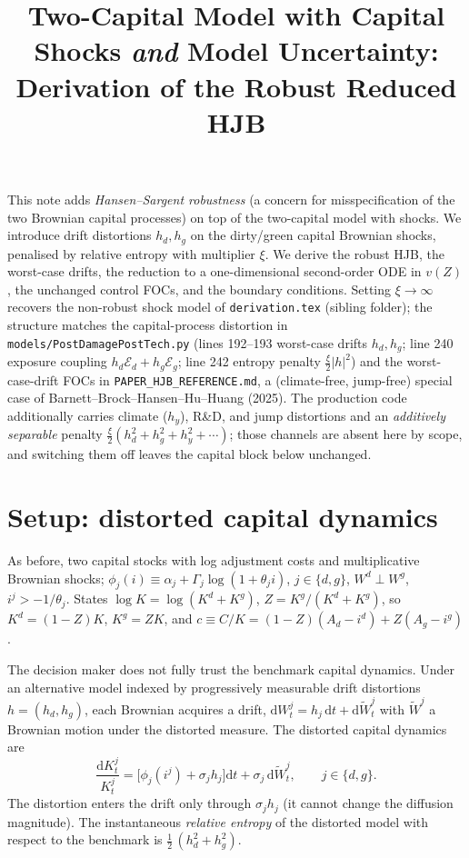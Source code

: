 \documentclass[11pt]{article}
\title{Two-Capital Model with Capital Shocks \emph{and} Model Uncertainty:\\
Derivation of the Robust Reduced HJB}
\author{}
\date{}
\newcommand{\dd}{\mathrm{d}}
\newcommand{\xicap}{\xi}
\begin{document}
\maketitle
\vspace{-3em}

This note adds \emph{Hansen--Sargent robustness} (a concern for misspecification of
the two Brownian capital processes) on top of the two-capital model with shocks. We
introduce drift distortions $h_d,h_g$ on the dirty/green capital Brownian shocks,
penalised by relative entropy with multiplier $\xicap$. We derive the robust HJB, the
worst-case drifts, the reduction to a one-dimensional second-order ODE in $v(Z)$, the
unchanged control FOCs, and the boundary conditions. Setting $\xicap\to\infty$ recovers
the non-robust shock model of \texttt{derivation.tex} (sibling folder); the structure
matches the capital-process distortion in \texttt{models/PostDamagePostTech.py}
(lines 192--193 worst-case drifts $h_d,h_g$; line 240 exposure coupling
$h_d\mathcal E_d+h_g\mathcal E_g$; line 242 entropy penalty $\tfrac{\xicap}{2}|h|^2$) and
the worst-case-drift FOCs in \texttt{PAPER\_HJB\_REFERENCE.md}, a (climate-free,
jump-free) special case of Barnett--Brock--Hansen--Hu--Huang (2025). The production code
additionally carries climate ($h_y$), R\&D, and jump distortions and an
\emph{additively separable} penalty $\tfrac{\xicap}{2}(h_d^2+h_g^2+h_y^2+\cdots)$; those
channels are absent here by scope, and switching them off leaves the capital block below
unchanged.

\section{Setup: distorted capital dynamics}

As before, two capital stocks with log adjustment costs and multiplicative Brownian
shocks; $\phi_j(i)\equiv\alpha_j+\Gamma_j\log(1+\theta_j i)$, $j\in\{d,g\}$,
$W^d\perp W^g$, $i^j>-1/\theta_j$. States $\log K=\log(K^d+K^g)$,
$Z=K^g/(K^d+K^g)$, so $K^d=(1-Z)K$, $K^g=ZK$, and $c\equiv C/K=(1-Z)(A_d-i^d)+Z(A_g-i^g)$.

The decision maker does not fully trust the benchmark capital dynamics. Under an
alternative model indexed by progressively measurable drift distortions
$h=(h_d,h_g)$, each Brownian acquires a drift, $\dd W^j_t=h_j\,\dd t+\dd \widetilde W^j_t$
with $\widetilde W^j$ a Brownian motion under the distorted measure. The distorted
capital dynamics are
\[
\frac{\dd K^j_t}{K^j_t}=\big[\phi_j(i^j)+\sigma_j h_j\big]\dd t+\sigma_j\,\dd \widetilde W^j_t,
\qquad j\in\{d,g\}.
\]
The distortion enters the drift only through $\sigma_j h_j$ (it cannot change the
diffusion magnitude). The instantaneous \emph{relative entropy} of the distorted model
with respect to the benchmark is $\tfrac12\,(h_d^2+h_g^2)$.
\end{document}
